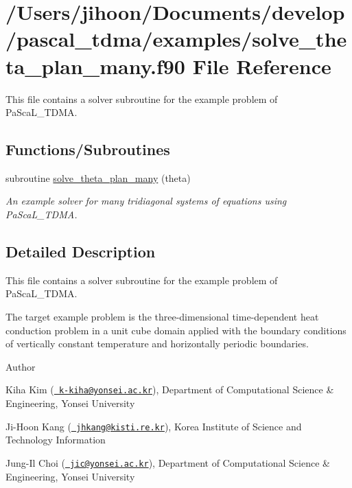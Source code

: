 \hypertarget{solve__theta__plan__many_8f90}{}\section{/\+Users/jihoon/\+Documents/develop/pascal\+\_\+tdma/examples/solve\+\_\+theta\+\_\+plan\+\_\+many.f90 File Reference}
\label{solve__theta__plan__many_8f90}


This file contains a solver subroutine for the example problem of Pa\+Sca\+L\+\_\+\+T\+D\+MA.  


\subsection*{Functions/\+Subroutines}
\begin{DoxyCompactItemize}
\item 
subroutine \mbox{\hyperlink{solve__theta__plan__many_8f90_af048018fcdfbe66e00922dee3e7e9a64}{solve\+\_\+theta\+\_\+plan\+\_\+many}} (theta)
\begin{DoxyCompactList}\small\item\em An example solver for many tridiagonal systems of equations using Pa\+Sca\+L\+\_\+\+T\+D\+MA. \end{DoxyCompactList}\end{DoxyCompactItemize}


\subsection{Detailed Description}
This file contains a solver subroutine for the example problem of Pa\+Sca\+L\+\_\+\+T\+D\+MA. 

The target example problem is the three-\/dimensional time-\/dependent heat conduction problem in a unit cube domain applied with the boundary conditions of vertically constant temperature and horizontally periodic boundaries. \begin{DoxyAuthor}{Author}

\end{DoxyAuthor}

\begin{DoxyItemize}
\item Kiha Kim (\href{mailto:k-kiha@yonsei.ac.kr}{\texttt{ k-\/kiha@yonsei.\+ac.\+kr}}), Department of Computational Science \& Engineering, Yonsei University
\item Ji-\/\+Hoon Kang (\href{mailto:jhkang@kisti.re.kr}{\texttt{ jhkang@kisti.\+re.\+kr}}), Korea Institute of Science and Technology Information
\item Jung-\/\+Il Choi (\href{mailto:jic@yonsei.ac.kr}{\texttt{ jic@yonsei.\+ac.\+kr}}), Department of Computational Science \& Engineering, Yonsei University
\end{DoxyItemize}

